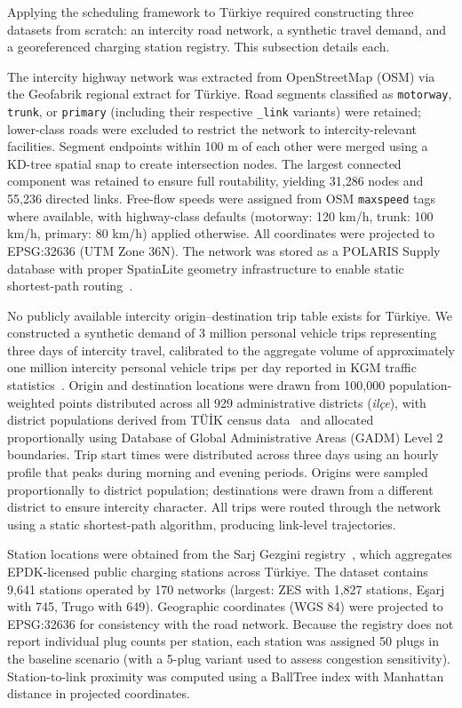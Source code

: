 Applying the scheduling framework to T\"{u}rkiye required constructing three datasets from scratch: an intercity road network, a synthetic travel demand, and a georeferenced charging station registry. This subsection details each.

The intercity highway network was extracted from OpenStreetMap (OSM) via the Geofabrik regional extract for T\"{u}rkiye. Road segments classified as \texttt{motorway}, \texttt{trunk}, or \texttt{primary} (including their respective \texttt{\_link} variants) were retained; lower-class roads were excluded to restrict the network to intercity-relevant facilities. Segment endpoints within 100 m of each other were merged using a KD-tree spatial snap to create intersection nodes. The largest connected component was retained to ensure full routability, yielding 31,286 nodes and 55,236 directed links. Free-flow speeds were assigned from OSM \texttt{maxspeed} tags where available, with highway-class defaults (motorway: 120 km/h, trunk: 100 km/h, primary: 80 km/h) applied otherwise. All coordinates were projected to EPSG:32636 (UTM Zone 36N). The network was stored as a POLARIS Supply database with proper SpatiaLite geometry infrastructure to enable static shortest-path routing~\cite{auld_2016}.

No publicly available intercity origin--destination trip table exists for T\"{u}rkiye. We constructed a synthetic demand of 3 million personal vehicle trips representing three days of intercity travel, calibrated to the aggregate volume of approximately one million intercity personal vehicle trips per day reported in KGM traffic statistics~\cite{kgm_traffic_2024}. Origin and destination locations were drawn from 100,000 population-weighted points distributed across all 929 administrative districts (\textit{il\c{c}e}), with district populations derived from T\"{U}\.{I}K census data~\cite{tuik_vehicles_2024} and allocated proportionally using Database of Global Administrative Areas (GADM) Level 2 boundaries. Trip start times were distributed across three days using an hourly profile that peaks during morning and evening periods. Origins were sampled proportionally to district population; destinations were drawn from a different district to ensure intercity character. All trips were routed through the network using a static shortest-path algorithm, producing link-level trajectories.


Station locations were obtained from the Sarj Gezgini registry~\cite{sarjgezgini_2025}, which aggregates EPDK-licensed public charging stations across T\"{u}rkiye. The dataset contains 9,641 stations operated by 170 networks (largest: ZES with 1,827 stations, E\c{s}arj with 745, Trugo with 649). Geographic coordinates (WGS 84) were projected to EPSG:32636 for consistency with the road network. Because the registry does not report individual plug counts per station, each station was assigned 50 plugs in the baseline scenario (with a 5-plug variant used to assess congestion sensitivity). Station-to-link proximity was computed using a BallTree index with Manhattan distance in projected coordinates.

